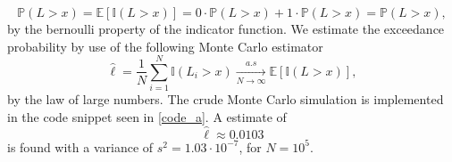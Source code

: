 \documentclass{article}
\begin{document}
\begin{equation*}
    \mathbb{P}(L > x) = \mathbb{E}[\mathbb{I}(L > x)] = 0\cdot\mathbb{P}(L > x) + 1\cdot\mathbb{P}(L > x) = \mathbb{P}(L > x),
\end{equation*}
by the bernoulli property of the indicator function. We estimate the exceedance probability by use of the following Monte Carlo estimator
\begin{equation*}
    \hat\ell = \frac{1}{N}\sum_{i=1}^{N} \mathbb{I}(L_i > x) \xrightarrow[N \to \infty]{a.s} \mathbb{E}[\mathbb{I}(L > x)],
\end{equation*}
by the law of large numbers. The crude Monte Carlo simulation is implemented in the code snippet seen in \autoref{code_a}. A estimate of
\begin{equation*}
    \hat{\ell} \approx 0.0103
\end{equation*}
is found with a variance of $s^2 = 1.03\cdot 10^{-7}$, for $N = 10^5$.



\end{document}

